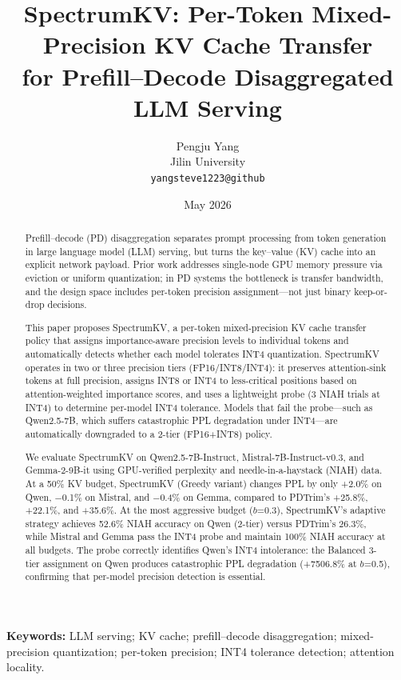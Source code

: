 \documentclass[11pt]{article}
\title{SpectrumKV: Per-Token Mixed-Precision KV Cache Transfer\\for Prefill--Decode Disaggregated LLM Serving}
\author{Pengju Yang\\
Jilin University\\
\texttt{yangsteve1223@github}}
\date{May 2026}
\newcommand{\method}{SpectrumKV}
\newcommand{\fullmethod}{SpectrumKV}
\newcommand{\pct}{\%}
\theoremstyle{definition}
\theoremstyle{plain}
\begin{document}
\maketitle

\begin{abstract}
Prefill--decode (PD) disaggregation separates prompt processing from token generation in large language model (LLM) serving, but turns the key--value (KV) cache into an explicit network payload.  Prior work addresses single-node GPU memory pressure via eviction or uniform quantization; in PD systems the bottleneck is transfer bandwidth, and the design space includes per-token precision assignment---not just binary keep-or-drop decisions.

This paper proposes \fullmethod{}, a per-token mixed-precision KV cache transfer policy that assigns importance-aware precision levels to individual tokens and automatically detects whether each model tolerates INT4 quantization.  \method{} operates in two or three precision tiers (FP16/INT8/INT4): it preserves attention-sink tokens at full precision, assigns INT8 or INT4 to less-critical positions based on attention-weighted importance scores, and uses a lightweight probe (3 NIAH trials at INT4) to determine per-model INT4 tolerance.  Models that fail the probe---such as Qwen2.5-7B, which suffers catastrophic PPL degradation under INT4---are automatically downgraded to a 2-tier (FP16+INT8) policy.

We evaluate \method{} on Qwen2.5-7B-Instruct, Mistral-7B-Instruct-v0.3, and Gemma-2-9B-it using GPU-verified perplexity and needle-in-a-haystack (NIAH) data.  At a 50\pct{} KV budget, \method{} (Greedy variant) changes PPL by only +2.0\pct{} on Qwen, $-$0.1\pct{} on Mistral, and $-$0.4\pct{} on Gemma, compared to PDTrim's +25.8\pct{}, +22.1\pct{}, and +35.6\pct{}.  At the most aggressive budget ($b$=0.3), \method{}'s adaptive strategy achieves 52.6\pct{} NIAH accuracy on Qwen (2-tier) versus PDTrim's 26.3\pct{}, while Mistral and Gemma pass the INT4 probe and maintain 100\pct{} NIAH accuracy at all budgets.  The probe correctly identifies Qwen's INT4 intolerance: the Balanced 3-tier assignment on Qwen produces catastrophic PPL degradation (+7506.8\pct{} at $b$=0.5), confirming that per-model precision detection is essential.
\end{abstract}

\noindent\textbf{Keywords:} LLM serving; KV cache; prefill--decode disaggregation; mixed-precision quantization; per-token precision; INT4 tolerance detection; attention locality.
\end{document}
